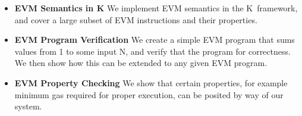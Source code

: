 \begin{itemize}
\item{\bf EVM Semantics in K} We implement EVM semantics in the K~framework, and
cover a large subset of EVM instructions and their properties.
\item{\bf EVM Program Verification} We create a simple EVM program that sums
values from 1 to some input N, and verify that the program for correctness. We then show how this can be extended to any given EVM program.
\item{\bf EVM Property Checking} We show that certain properties, for example
minimum gas required for proper execution, can be posited by way of our system.
\end{itemize}
